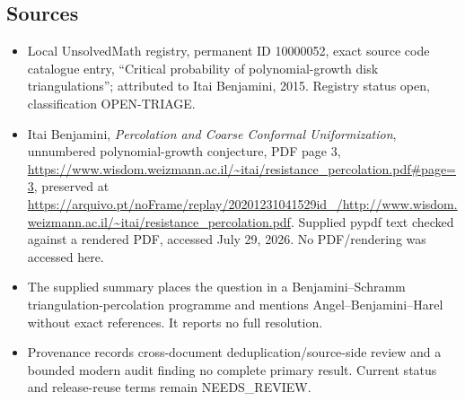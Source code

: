 \documentclass[11pt]{article}
\begin{document}
\subsection{Sources}
\begin{itemize}
\item Local UnsolvedMath registry, permanent ID 10000052, exact source code catalogue entry, ``Critical probability of polynomial-growth disk triangulations''; attributed to Itai Benjamini, 2015. Registry status open, classification OPEN-TRIAGE.
\item Itai Benjamini, \emph{Percolation and Coarse Conformal Uniformization}, unnumbered polynomial-growth conjecture, PDF page 3, \url{https://www.wisdom.weizmann.ac.il/~itai/resistance_percolation.pdf#page=3}, preserved at \url{https://arquivo.pt/noFrame/replay/20201231041529id_/http://www.wisdom.weizmann.ac.il/~itai/resistance_percolation.pdf}. Supplied pypdf text checked against a rendered PDF, accessed July 29, 2026. No PDF/rendering was accessed here.
\item The supplied summary places the question in a Benjamini--Schramm triangulation-percolation programme and mentions Angel--Benjamini--Harel without exact references. It reports no full resolution.
\item Provenance records cross-document deduplication/source-side review and a bounded modern audit finding no complete primary result. Current status and release-reuse terms remain NEEDS\_REVIEW.
\end{itemize}
\end{document}
